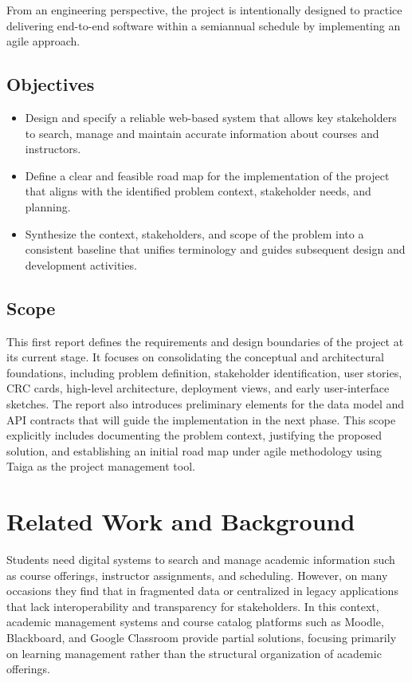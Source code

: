 \documentclass[12pt,a4paper]{article}
\begin{document}
From an engineering perspective, the project is intentionally designed to practice delivering end-to-end software within a semiannual schedule by implementing an agile approach.

\subsection{Objectives}
\begin{itemize}[leftmargin=1.2em]
  \item Design and specify a reliable web-based system that allows key stakeholders to search, manage and maintain accurate information about courses and instructors.
  \item Define a clear and feasible road map for the implementation of the project that aligns with the identified problem context, stakeholder needs, and planning.
  \item Synthesize the context, stakeholders, and scope of the problem into a consistent baseline that unifies terminology and guides subsequent design and development activities.
\end{itemize}


\subsection{Scope}
This first report defines the requirements and design boundaries of the project at its current stage. It focuses on consolidating the conceptual and architectural foundations, including problem definition, stakeholder identification, user stories, CRC cards, high-level architecture, deployment views, and early user-interface sketches. The report also introduces preliminary elements for the data model and API contracts that will guide the implementation in the next phase. This scope explicitly includes documenting the problem context, justifying the proposed solution, and establishing an initial road map under agile methodology using Taiga as the project management tool.


\section{Related Work and Background}
\label{sec:related}

 Students need digital systems to search and manage academic information such as course offerings, instructor assignments, and scheduling. However, on many occasions they find that in fragmented data or centralized in legacy applications that lack interoperability and transparency for stakeholders. In this context, academic management systems and course catalog platforms such as Moodle, Blackboard, and Google Classroom provide partial solutions, focusing primarily on learning management rather than the structural organization of academic offerings.\newline
\end{document}
